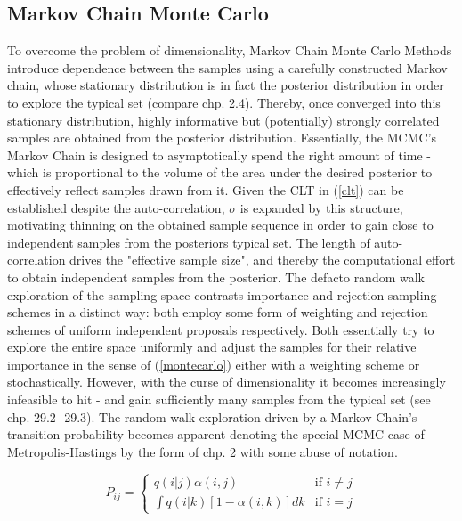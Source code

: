 \documentclass[11pt]{article}
\begin{document}
        \subsection{Markov Chain Monte Carlo}
        To overcome the problem of dimensionality, Markov Chain Monte Carlo Methods introduce dependence between the samples using a carefully constructed Markov chain, whose stationary distribution is in fact the posterior distribution in order to explore the typical set (compare \cite{betancourt2017conceptual} chp. 2.4). Thereby, once converged into this stationary distribution, highly informative but (potentially) strongly correlated samples are obtained from the posterior distribution.
        Essentially, the MCMC's Markov Chain is designed to asymptotically spend the right amount of time - which is proportional to the volume of the area under the desired posterior to effectively reflect samples drawn from it. Given the CLT in (\ref{clt}) can be established despite the auto-correlation, $\sigma$ is expanded by this structure, motivating thinning on the obtained sample sequence in order to gain close to independent samples from the posteriors typical set. The length of auto-correlation drives the "effective sample size", and thereby the computational effort to obtain independent samples from the posterior.
        The defacto random walk exploration of the sampling space contrasts importance and rejection sampling schemes in a distinct way: both employ some form of weighting and rejection schemes of uniform independent proposals respectively. Both essentially try to explore the entire space uniformly and adjust the samples for their relative importance in the sense of (\ref{montecarlo}) either with a weighting scheme or stochastically. However, with the curse of dimensionality it becomes increasingly infeasible to hit - and gain sufficiently many samples from the typical set (see \cite{mackay2003information} chp. 29.2 -29.3).
        The random walk exploration driven by a Markov Chain's transition probability becomes apparent denoting the special MCMC case of Metropolis-Hastings \cite{} by the form of \cite{roberts1999note} chp. 2 with some abuse of notation.

        \begin{equation}
            P_{ij} = \begin{cases}
                        q(i|j)\alpha(i,j) & \text{if } i \neq j \\
                        \int q(i|k)[1-\alpha(i,k)] dk & \text{if } i = j
            \end{cases}
        \end{equation}
\end{document}
